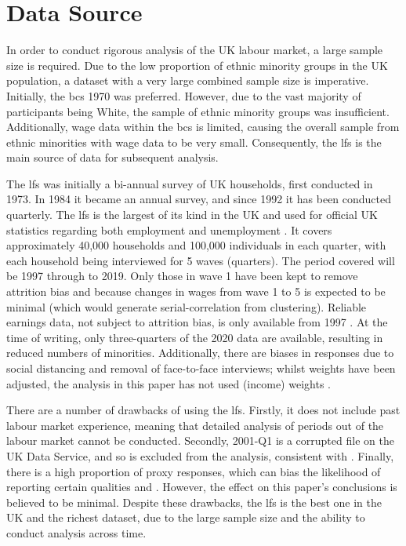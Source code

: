 \documentclass[class=article, crop=false]{standalone}
\begin{document}
\section{Data Source}
\label{sec:Data}
In order to conduct rigorous analysis of the UK labour market, a large sample size is required. Due to the low proportion of ethnic minority groups in the UK population, a dataset with a very large combined sample size is imperative. Initially, the \acrfull{bcs} 1970 was preferred. However, due to the vast majority of participants being White, the sample of ethnic minority groups was insufficient. Additionally, wage data within the \acrshort{bcs} is limited, causing the overall sample from ethnic minorities with wage data to be very small. Consequently, the \acrfull{lfs} is the main source of data for subsequent analysis.

The \acrshort{lfs} was initially a bi-annual survey of UK households, first conducted in 1973. In 1984 it became an annual survey, and since 1992 it has been conducted quarterly. The \acrshort{lfs} is the largest of its kind in the UK and used for official UK statistics regarding both employment and unemployment \citep{ONS}. It covers approximately 40,000 households and 100,000 individuals in each quarter, with each household being interviewed for 5 waves (quarters). The period covered will be 1997 through to 2019. Only those in wave 1 have been kept to remove attrition bias and because changes in wages from wave 1 to 5 is expected to be minimal (which would generate serial-correlation from clustering). Reliable earnings data, not subject to attrition bias, is only available from 1997 \citep{ONSa}. At the time of writing, only three-quarters of the 2020 data are available, resulting in reduced numbers of minorities. Additionally, there are biases in responses due to social distancing and removal of face-to-face interviews; whilst weights have been adjusted, the analysis in this paper has not used (income) weights \citep{ONSb}. 

There are a number of drawbacks of using the \acrshort{lfs}. Firstly, it does not include past labour market experience, meaning that detailed analysis of periods out of the labour market cannot be conducted. Secondly, 2001-Q1 is a corrupted file on the UK Data Service, and so is excluded from the analysis, consistent with \citet{Longhi}. Finally, there is a high proportion of proxy responses, which can bias the likelihood of reporting certain qualities \citep{Clarke} and \citep{Davies}. However, the effect on this paper's conclusions is believed to be minimal. Despite these drawbacks, the \acrshort{lfs} is the best one in the UK and the richest dataset, due to the large sample size and the ability to conduct analysis across time.
\end{document}
